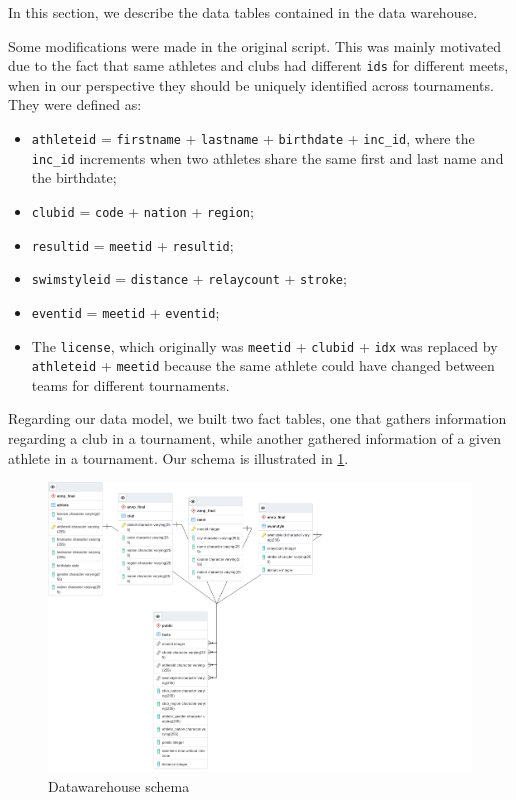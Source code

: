 \documentclass[a4paper, 11pt]{article}
\begin{document}
\vspace{\baselineskip}

In this section, we describe the data tables contained in the data warehouse. 

Some modifications were made in the original script. This was mainly motivated due to the fact that same athletes and clubs had different
\texttt{ids} for different meets, when in our perspective they should be uniquely identified across tournaments. They were defined as: 

\vspace{\baselineskip}

\begin{itemize}
    \item \texttt{athleteid} = \texttt{firstname} + \texttt{lastname} + \texttt{birthdate} + \texttt{inc\_id}, where the \texttt{inc\_id} increments when two athletes share the same first and last name and the birthdate;
    \item \texttt{clubid} = \texttt{code} + \texttt{nation} + \texttt{region};
    \item \texttt{resultid} = \texttt{meetid} + \texttt{resultid};
    \item \texttt{swimstyleid} = \texttt{distance} + \texttt{relaycount} + \texttt{stroke};
    \item \texttt{eventid} = \texttt{meetid} + \texttt{eventid};
    \item The \texttt{license}, which originally was \texttt{meetid} + \texttt{clubid} + \texttt{idx} was replaced by \texttt{athleteid} + \texttt{meetid} because the same athlete could have changed between teams for different tournaments.
\end{itemize}

\vspace{\baselineskip}

Regarding our data model, we built two fact tables, one that gathers information regarding a club in a tournament, while another gathered 
information of a given athlete in a tournament. Our schema is illustrated in \cref{fig:defact}. 

\begin{figure}[H]
    \centering
    \includegraphics[width=\textwidth]{img/er.png}
    \caption{Datawarehouse schema}
    \label{fig:defact}
\end{figure}
\end{document}
